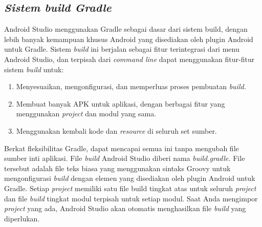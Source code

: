\subsection{\textit{Sistem build Gradle}}
\par Android Studio menggunakan Gradle sebagai dasar dari sistem build, dengan lebih banyak kemampuan khusus Android yang disediakan oleh plugin Android untuk Gradle. Sistem\textit{ build }ini berjalan sebagai fitur terintegrasi dari menu Android Studio, dan terpisah dari\textit{ command line} dapat menggunakan fitur-fitur sistem \textit{build} untuk:
\begin{enumerate}
    \item Menyesuaikan, mengonfigurasi, dan memperluas proses pembuatan \textit{build.}
    \item Membuat banyak APK untuk aplikasi, dengan berbagai fitur yang menggunakan \textit{project }dan modul yang sama.
    \item Menggunakan kembali kode dan \textit{resource} di seluruh set sumber.
\end{enumerate}
\par Berkat fleksibilitas Gradle, dapat mencapai semua ini tanpa mengubah file sumber inti aplikasi. File \textit{build} Android Studio diberi nama \textit{build.gradle.} File tersebut adalah file teks biasa yang menggunakan sintaks Groovy untuk mengonfigurasi\textit{ build }dengan elemen yang disediakan oleh plugin Android untuk Gradle. Setiap \textit{project} memiliki satu file build tingkat atas untuk seluruh \textit{project }dan file \textit{build }tingkat modul terpisah untuk setiap modul. Saat Anda mengimpor\textit{ project }yang ada, Android Studio akan otomatis menghasilkan file\textit{ build }yang diperlukan.
